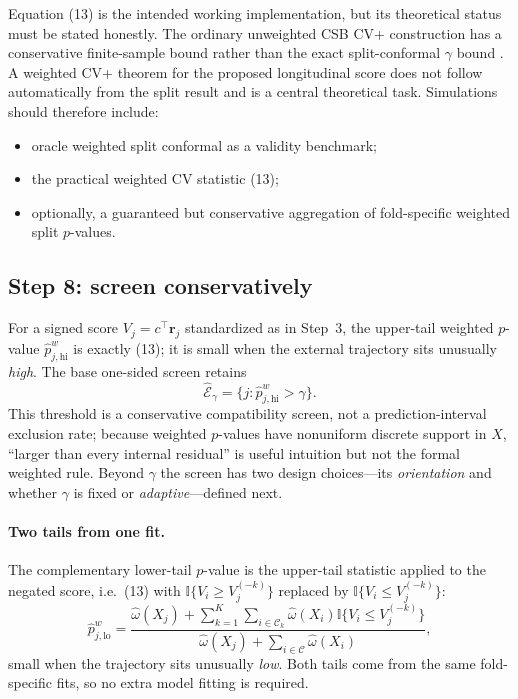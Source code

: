 \documentclass[11pt]{article}
\newcommand{\ind}{\mathbb{I}}
\begin{document}
Equation (13) is the intended working implementation, but its theoretical status must be stated honestly. The ordinary unweighted CSB CV+ construction has a conservative finite-sample bound rather than the exact split-conformal $\gamma$ bound \citep{zhu2025csb}. A weighted CV+ theorem for the proposed longitudinal score does not follow automatically from the split result and is a central theoretical task. Simulations should therefore include:
\begin{itemize}
    \item oracle weighted split conformal as a validity benchmark;
    \item the practical weighted CV statistic (13);
    \item optionally, a guaranteed but conservative aggregation of fold-specific weighted split $p$-values.
\end{itemize}

\subsection{Step 8: screen conservatively}\label{sec:screen}

For a signed score $V_j=c^{\top}\bm r_j$ standardized as in Step~3, the upper-tail weighted $p$-value $\widehat p_{j,\mathrm{hi}}^{w}$ is exactly (13); it is small when the external trajectory sits unusually \emph{high}. The base one-sided screen retains
\[
\widehat{\mathcal E}_{\gamma}
=
\{j:\widehat p_{j,\mathrm{hi}}^{w}>\gamma\}.
\tag{14}
\]
This threshold is a conservative compatibility screen, not a prediction-interval exclusion rate; because weighted $p$-values have nonuniform discrete support in $X$, ``larger than every internal residual'' is useful intuition but not the formal weighted rule. Beyond $\gamma$ the screen has two design choices---its \emph{orientation} and whether $\gamma$ is fixed or \emph{adaptive}---defined next.

\paragraph{Two tails from one fit.} The complementary lower-tail $p$-value is the upper-tail statistic applied to the negated score, i.e.\ (13) with $\ind\{V_i\ge V_j^{(-k)}\}$ replaced by $\ind\{V_i\le V_j^{(-k)}\}$:
\[
\widehat p_{j,\mathrm{lo}}^{w}
=
\frac{\widehat\omega(X_j)+\sum_{k=1}^{K}\sum_{i\in\mathcal C_k}\widehat\omega(X_i)\ind\{V_i\le V_j^{(-k)}\}}
{\widehat\omega(X_j)+\sum_{i\in\mathcal C}\widehat\omega(X_i)},
\]
small when the trajectory sits unusually \emph{low}. Both tails come from the same fold-specific fits, so no extra model fitting is required.
\end{document}
